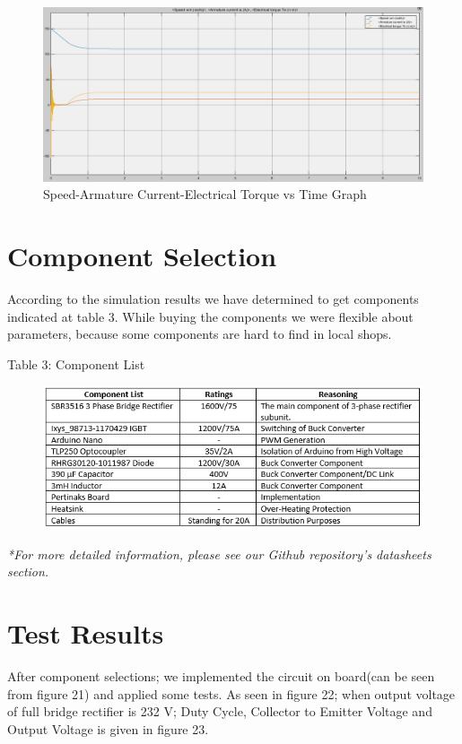 \documentclass{article}
\begin{document}
\begin{figure}[H]
\centering
\includegraphics[scale=0.25]{torkvs}
\caption{Speed-Armature Current-Electrical Torque vs Time Graph }
\label{fig:members}
\end{figure}



\section{Component Selection}
According to the simulation results we have determined to get components indicated at table 3. While buying the components we were flexible about parameters, because some components are hard to find in local shops. 

\noindent Table 3: Component List
\begin{figure}[H]
\centering
\includegraphics[scale=0.8]{componentselection}
\label{fig:members}
\end{figure} 

\textit{*For more detailed information, please see our Github repository's datasheets section.}

\section{Test Results}%
After component selections; we implemented the circuit on board(can be seen from figure 21) and applied some tests. As seen in figure 22; when output voltage of full bridge rectifier is 232 V; Duty Cycle, Collector to Emitter Voltage and Output Voltage is given in figure 23. 
\end{document}
